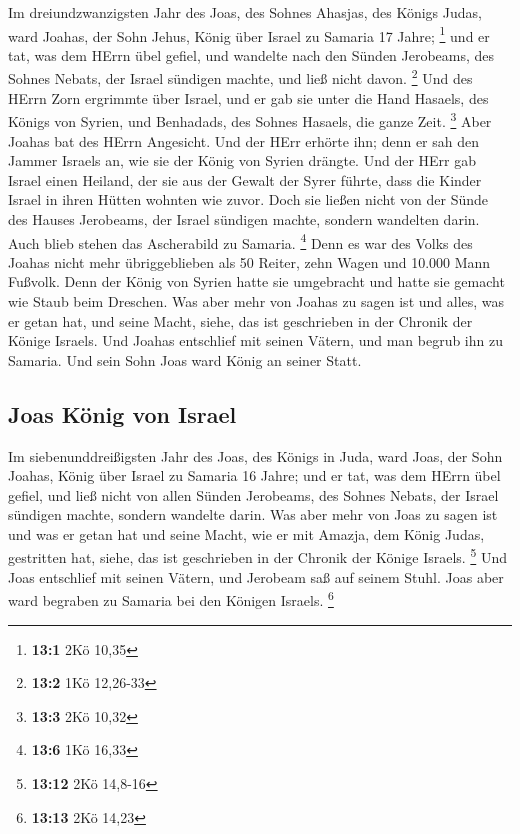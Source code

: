  Im dreiundzwanzigsten Jahr des Joas, des Sohnes Ahasjas,
des Königs Judas, ward Joahas, der Sohn Jehus, König über Israel zu
Samaria 17 Jahre; \footnote{\textbf{13:1} 2Kö 10,35}  und
er tat, was dem HErrn übel gefiel, und wandelte nach den Sünden
Jerobeams, des Sohnes Nebats, der Israel sündigen machte, und ließ nicht
davon. \footnote{\textbf{13:2} 1Kö 12,26-33}  Und des
HErrn Zorn ergrimmte über Israel, und er gab sie unter die Hand Hasaels,
des Königs von Syrien, und Benhadads, des Sohnes Hasaels, die ganze
Zeit. \footnote{\textbf{13:3} 2Kö 10,32}  Aber Joahas bat
des HErrn Angesicht. Und der HErr erhörte ihn; denn er sah den Jammer
Israels an, wie sie der König von Syrien drängte.  Und der
HErr gab Israel einen Heiland, der sie aus der Gewalt der Syrer führte,
dass die Kinder Israel in ihren Hütten wohnten wie zuvor. 
Doch sie ließen nicht von der Sünde des Hauses Jerobeams, der Israel
sündigen machte, sondern wandelten darin. Auch blieb stehen das
Ascherabild zu Samaria. \footnote{\textbf{13:6} 1Kö 16,33}
 Denn es war des Volks des Joahas nicht mehr
übriggeblieben als 50 Reiter, zehn Wagen und 10.000 Mann Fußvolk. Denn
der König von Syrien hatte sie umgebracht und hatte sie gemacht wie
Staub beim Dreschen.  Was aber mehr von Joahas zu sagen
ist und alles, was er getan hat, und seine Macht, siehe, das ist
geschrieben in der Chronik der Könige Israels.  Und Joahas
entschlief mit seinen Vätern, und man begrub ihn zu Samaria. Und sein
Sohn Joas ward König an seiner Statt.

\hypertarget{joas-kuxf6nig-von-israel}{%
\subsection{Joas König von Israel}\label{joas-kuxf6nig-von-israel}}

 Im siebenunddreißigsten Jahr des Joas, des Königs in
Juda, ward Joas, der Sohn Joahas, König über Israel zu Samaria 16 Jahre;
 und er tat, was dem HErrn übel gefiel, und ließ nicht
von allen Sünden Jerobeams, des Sohnes Nebats, der Israel sündigen
machte, sondern wandelte darin.  Was aber mehr von Joas
zu sagen ist und was er getan hat und seine Macht, wie er mit Amazja,
dem König Judas, gestritten hat, siehe, das ist geschrieben in der
Chronik der Könige Israels. \footnote{\textbf{13:12} 2Kö 14,8-16}
 Und Joas entschlief mit seinen Vätern, und Jerobeam saß
auf seinem Stuhl. Joas aber ward begraben zu Samaria bei den Königen
Israels. \footnote{\textbf{13:13} 2Kö 14,23}

